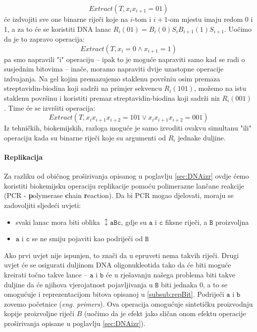 \documentclass[a4paper,oneside,12pt]{memoir} %
\begin{document}
\begin{spacing}{1.5}
\[Extract(T, x_ix_{i+1}=01)\] 
će izdvojiti sve one binarne riječi koje na $i$-tom i $i+1$-om mjestu imaju redom 0 i 1, a za to će se koristiti DNA lanac $R_i(01)=B_i(0)S_{i}B_{i+1}(1)S_{i+1}$. Uočimo da je to zapravo operacija:
\[Extract(T, x_i=0 \wedge x_{i+1}=1)\]
pa smo napravili "i" operaciju -- ipak to je moguće napraviti samo kad se radi o susjednim bitovima -- inače, moramo napraviti dvije uzastopne operacije izdvajanja. Na gel kojim premazujemo staklenu površniu osim premaza streptavidin-biodina koji sadrži na primjer sekvencu $R_i(101)$, možemo na istu staklenu površinu i koristiti premaz streptavidin-biodina koji sadrži niz $R_i(001)$. Time će se izvršiti operacija:
\[Extract(T, x_ix_{i+1}x_{i+2}=101 \vee x_ix_{i+1}x_{i+2}=001)\] 
Iz tehničkih, biokemijskih, razloga moguće je samo izvoditi ovakvu simultanu "ili" operaciju kada su binarne riječi koje su argumenti od $R_i$ jednake duljine.
\paragraph{Replikacija} Za razliku od običnog proširivanja opisanog u poglavlju \ref{sec:DNAizr} ovdje ćemo koristiti biokemijsku operaciju replikacije pomoću polimerazne lančane reakcije (PCR - \textbf{p}olymerase \textbf{c}hain \textbf{r}eaction). Da bi PCR mogao djelovati, moraju se zadovoljiti sljedeći uvjeti:
\begin{itemize}
\item svaki lanac mora biti oblika $\mathtt{\updownarrow aBc}$, gdje su $\mathtt{a}$ i $\mathtt{c}$ fiksne riječi, a $\mathtt{B}$ proizvoljna
\item $\mathtt{a}$ i $\mathtt{c}$ se ne smiju pojaviti kao podriječi od $\mathtt{B}$
\end{itemize}
Ako prvi uvjet nije ispunjen, to znači da u epruveti nema takvih riječi. Drugi uvjet će se osigurati duljinom DNA oligonukleotida tako da će biti moguće kreirati točno takve lance -- $\mathtt{a}$ i $\mathtt{b}$ će u rješavanju našega problema biti takve duljine da će njihova vjerojatnost pojavljivanja u $\mathtt{B}$ biti jednaka 0, a to se omogućuje i reprezentacijom bitova opisanoj u \ref{subsub:repBit}. Podriječi $\mathtt{a}$ i $\mathtt{b}$ zovemo početnice (\textit{eng. primers}). Ova operacija omogućuje sintetičku proizvodnju kopije proizvoljne riječi $B$ (uočimo da je efekt jako sličan onom efektu operacije proširivanja opisane u poglavlju \ref{sec:DNAizr}).


\end{spacing}
\end{document}
